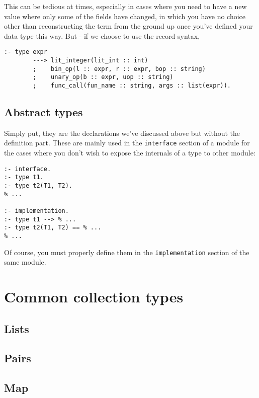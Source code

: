   This can be tedious at times, especially in cases where you need to have a new value where only some of the fields have changed, in which you have no choice other than reconstructing the term from the ground up once you've defined your data type this way. But - if we choose to use the record syntax, 

\begin{lstlisting}[language=Mercury]
:- type expr
        ---> lit_integer(lit_int :: int)
        ;    bin_op(l :: expr, r :: expr, bop :: string)
        ;    unary_op(b :: expr, uop :: string)
        ;    func_call(fun_name :: string, args :: list(expr)).
\end{lstlisting}



\subsection{Abstract types}

Simply put, they are the declarations we've discussed above but without the definition part. These are mainly used in the \texttt{interface} section of a module for the cases where you don't wish to expose the internals of a type to other module:

\begin{lstlisting}[language=Mercury]
:- interface.
:- type t1.
:- type t2(T1, T2).
% ...

:- implementation.
:- type t1 --> % ...
:- type t2(T1, T2) == % ...
% ...
\end{lstlisting}

Of course, you must properly define them in the \texttt{implementation} section of the same module.

\section{Common collection types}

\subsection{Lists}

\subsection{Pairs}

\subsection{Map}



